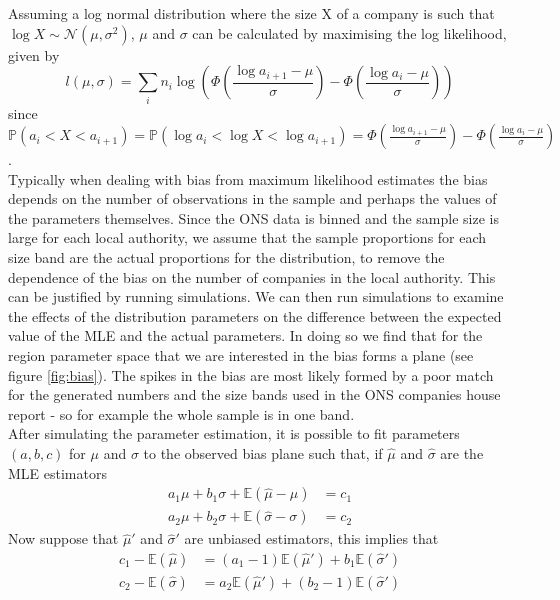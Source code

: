 \documentclass[a4paper,10pt]{article}
\begin{document}
   Assuming a log normal distribution where the size X of a company is such that $\log X \sim \mathcal{N}(\mu, \sigma^2)$, $\mu$ and $\sigma$ can be calculated by maximising the log likelihood, given by
   \begin{equation}
   l(\mu, \sigma) = \sum_i n_i \log \left( \Phi \left( \frac{\log a_{i + 1} - \mu}{\sigma} \right) - \Phi \left( \frac{\log a_{i} - \mu}{\sigma} \right) \right)
   \end{equation}
   since $\mathbb{P}(a_i < X < a_{i + 1}) = \mathbb{P}(\log a_i < \log X < \log a_{i + 1}) = \Phi \left( \frac{\log a_{i + 1} - \mu}{\sigma} \right) - \Phi \left( \frac{\log a_{i} - \mu}{\sigma} \right)$. \\
   Typically when dealing with bias from maximum likelihood estimates the bias depends on the number of observations in the sample and perhaps the values of the parameters themselves. Since the ONS data is binned and the sample size is large for each local authority, we assume that the sample proportions for each size band are the actual proportions for the distribution, to remove the dependence of the bias on the number of companies in the local authority. This can be justified by running simulations. We can then run simulations to examine the effects of the distribution parameters on the difference between the expected value of the MLE and the actual parameters. In doing so we find that for the region parameter space that we are interested in the bias forms a plane (see figure \ref{fig:bias}). The spikes in the bias are most likely formed by a poor match for the generated numbers and the size bands used in the ONS companies house report - so for example the whole sample is in one band.
   \\After simulating the parameter estimation, it is possible to fit parameters $(a, b, c)$ for $\mu$ and $\sigma$ to the observed bias plane such that, if $\hat{\mu}$ and $\hat{\sigma}$ are the MLE estimators
   \begin{align}
      a_1 \mu + b_1 \sigma + \mathbb{E}(\hat{\mu} - \mu) &= c_1\\
      a_2 \mu + b_2 \sigma + \mathbb{E}(\hat{\sigma} - \sigma) &= c_2
   \end{align}
   Now suppose that $\hat{\mu}'$ and $\hat{\sigma}'$ are unbiased estimators, this implies that
   \begin{align}
      c_1 - \mathbb{E}(\hat{\mu}) &= (a_1 - 1) \mathbb{E}(\hat{\mu}') + b_1 \mathbb{E}(\hat{\sigma}')\\
      c_2 - \mathbb{E}(\hat{\sigma}) &= a_2 \mathbb{E}(\hat{\mu}') + (b_2 - 1)\mathbb{E}(\hat{\sigma}')
   \end{align}
\end{document}
